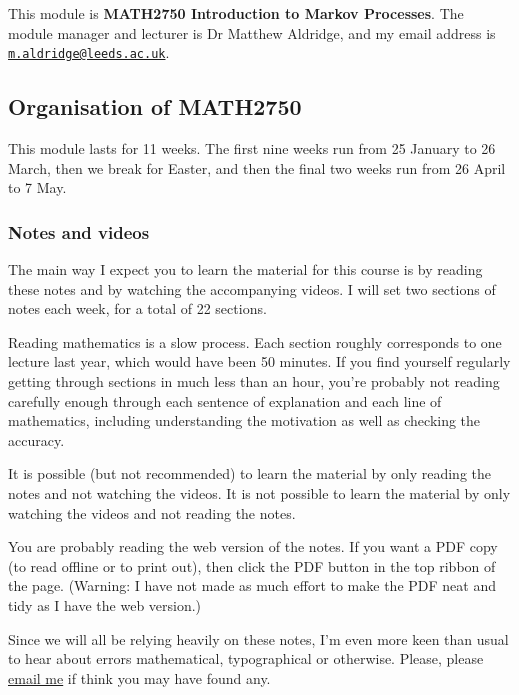 \documentclass[
  a4paper,
]{article}
\theoremstyle{definition}
\theoremstyle{definition}
\theoremstyle{definition}
\theoremstyle{remark}
\begin{document}
This module is \textbf{MATH2750 Introduction to Markov Processes}. The module manager and lecturer is Dr Matthew Aldridge, and my email address is \href{mailto:m.aldridge@leeds.ac.uk}{\nolinkurl{m.aldridge@leeds.ac.uk}}.

\hypertarget{about-module}{%
\subsection*{Organisation of MATH2750}\label{about-module}}

This module lasts for 11 weeks. The first nine weeks run from 25 January to 26 March, then we break for Easter, and then the final two weeks run from 26 April to 7 May.

\hypertarget{notes}{%
\subsubsection*{Notes and videos}\label{notes}}

The main way I expect you to learn the material for this course is by reading these notes and by watching the accompanying videos. I will set two sections of notes each week, for a total of 22 sections.

Reading mathematics is a slow process. Each section roughly corresponds to one lecture last year, which would have been 50 minutes. If you find yourself regularly getting through sections in much less than an hour, you're probably not reading carefully enough through each sentence of explanation and each line of mathematics, including understanding the motivation as well as checking the accuracy.

It is possible (but not recommended) to learn the material by only reading the notes and not watching the videos. It is not possible to learn the material by only watching the videos and not reading the notes.

You are probably reading the web version of the notes. If you want a PDF copy (to read offline or to print out), then click the PDF button in the top ribbon of the page. (Warning: I have not made as much effort to make the PDF neat and tidy as I have the web version.)

Since we will all be relying heavily on these notes, I'm even more keen than usual to hear about errors mathematical, typographical or otherwise. Please, please \href{mailto:m.aldridge@leeds.ac.uk}{email me} if think you may have found any.
\end{document}
